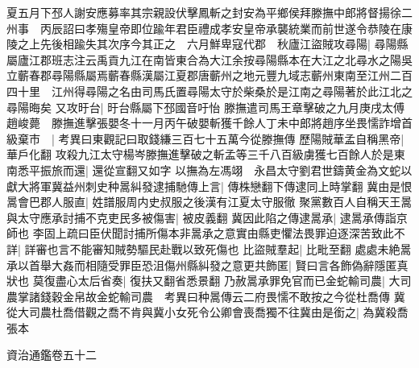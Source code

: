 夏五月下邳人謝安應募率其宗親設伏擊鳳斬之封安為平鄉侯拜滕撫中郎將督揚徐二州事　丙辰詔曰孝殤皇帝即位踰年君臣禮成孝安皇帝承襲統業而前世遂令恭陵在康陵之上先後相踰失其次序今其正之　六月鮮卑寇代郡　秋廬江盜賊攻尋陽|{
	尋陽縣屬廬江郡班志注云禹貢九江在南皆東合為大江余按尋陽縣本在大江之北尋水之陽吳立蘄春郡尋陽縣屬焉蘄春縣漢屬江夏郡唐蘄州之地元豐九域志蘄州東南至江州二百四十里　江州得尋陽之名由司馬氏置尋陽太守於柴桑於是江南之尋陽著於此江北之尋陽晦矣}
又攻旴台|{
	旴台縣屬下邳國音吁怡}
滕撫遣司馬王章擊破之九月庚戌太傅趙峻薨　滕撫進擊張嬰冬十一月丙午破嬰斬獲千餘人丁未中郎將趙序坐畏懦詐增首級棄市　|{
	考異曰東觀記曰取錢縑三百七十五萬今從滕撫傳}
歷陽賊華孟自稱黑帝|{
	華戶化翻}
攻殺九江太守楊岑滕撫進擊破之斬孟等三千八百級虜獲七百餘人於是東南悉平振旅而還|{
	還從宣翻又如字}
以撫為左馮翊　永昌太守劉君世鑄黄金為文蛇以獻大將軍冀益州刺史种暠糾發逮捕馳傳上言|{
	傳株戀翻下傳逮同上時掌翻}
冀由是恨暠會巴郡人服直|{
	姓譜服周内史叔服之後漢有江夏太守服徹}
聚黨數百人自稱天王暠與太守應承討捕不克吏民多被傷害|{
	被皮義翻}
冀因此陷之傳逮暠承|{
	逮暠承傳詣京師也}
李固上疏曰臣伏聞討捕所傷本非暠承之意實由縣吏懼法畏罪迫逐深苦致此不詳|{
	詳審也言不能審知賊勢驅民赴戰以致死傷也}
比盜賊羣起|{
	比毗至翻}
處處未絶暠承以首舉大姦而相隨受罪臣恐沮傷州縣糾發之意更共飾匿|{
	賢曰言各飾偽辭隱匿真狀也}
莫復盡心太后省奏|{
	復扶又翻省悉景翻}
乃赦暠承罪免官而已金蛇輸司農|{
	大司農掌諸錢穀金帛故金蛇輸司農　考異曰种暠傳云二府畏懦不敢按之今從杜喬傳}
冀從大司農杜喬借觀之喬不肯與冀小女死令公卿會喪喬獨不往冀由是銜之|{
	為冀殺喬張本}


資治通鑑卷五十二
